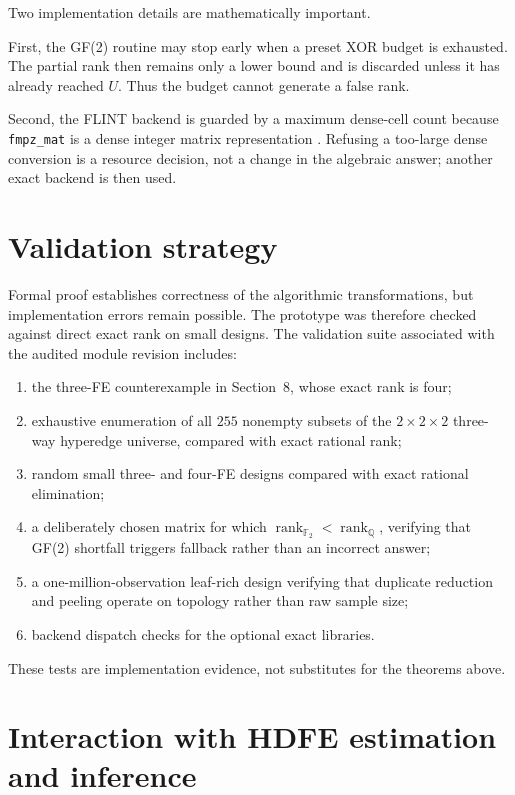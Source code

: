 \documentclass[11pt]{article}
\theoremstyle{definition}
\newcommand{\Q}{\mathbb{Q}}
\newcommand{\F}{\mathbb{F}}
\newcommand{\rank}{\operatorname{rank}}
\newcommand{\1}{\mathbf{1}}
\begin{document}
Two implementation details are mathematically important.

First, the GF(2) routine may stop early when a preset XOR budget is exhausted. The partial rank then remains only a lower bound and is discarded unless it has already reached $U$. Thus the budget cannot generate a false rank.

Second, the FLINT backend is guarded by a maximum dense-cell count because \texttt{fmpz\_mat} is a dense integer matrix representation \citep{FLINT2026}. Refusing a too-large dense conversion is a resource decision, not a change in the algebraic answer; another exact backend is then used.

\section{Validation strategy}

Formal proof establishes correctness of the algorithmic transformations, but implementation errors remain possible. The prototype was therefore checked against direct exact rank on small designs. The validation suite associated with the audited module revision includes:
\begin{enumerate}[label=(\alph*)]
  \item the three-FE counterexample in Section~8, whose exact rank is four;
  \item exhaustive enumeration of all $255$ nonempty subsets of the $2\times2\times2$ three-way hyperedge universe, compared with exact rational rank;
  \item random small three- and four-FE designs compared with exact rational elimination;
  \item a deliberately chosen matrix for which $\rank_{\F_2}<\rank_{\Q}$, verifying that GF(2) shortfall triggers fallback rather than an incorrect answer;
  \item a one-million-observation leaf-rich design verifying that duplicate reduction and peeling operate on topology rather than raw sample size;
  \item backend dispatch checks for the optional exact libraries.
\end{enumerate}
These tests are implementation evidence, not substitutes for the theorems above.

\section{Interaction with HDFE estimation and inference}
\end{document}
